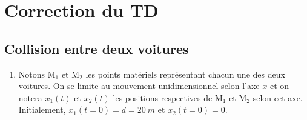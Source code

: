 \documentclass[a4paper, 12pt, final, garamond]{book}
\begin{document}
\setcounter{chapter}{1}

\chapter{Correction du TD}

\section{Collision entre deux voitures}
\begin{enumerate}
    \item Notons M$_1$ et M$_2$ les points matériels représentant chacun une des
        deux voitures. On se limite au mouvement unidimensionnel selon l'axe $x$
        et on notera $x_1(t)$ et $x_2(t)$ les positions respectives de M$_1$ et
        M$_2$ selon cet axe. Initialement, $x_1(t=0) = d = \SI{20}{m}$ et
        $x_2(t=0) = 0$. \bigbreak
	

\end{enumerate}
\end{document}
